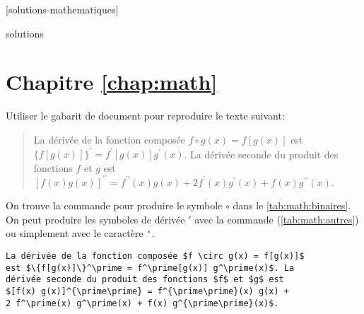 [solutions-mathematiques]

\begin{Filesave}{solutions}
\section*{Chapitre \ref*{chap:math}}

\end{Filesave}

\begin{exercice}
  Utiliser le gabarit de document  pour
  reproduire le texte suivant:
  \begin{quote}
    La dérivée de la fonction composée $f \circ g(x) = f[g(x)]$ est
    $\{f[g(x)]\}^\prime = f^\prime[g(x)] g^\prime(x)$. La dérivée
    seconde du produit des fonctions $f$ et $g$ est $[f(x)
    g(x)]^{\prime\prime} = f^{\prime\prime}(x) g(x) + 2 f^\prime(x)
    g^\prime(x) + f(x) g^{\prime\prime}(x)$.
  \end{quote}
  \begin{sol}
    On trouve la commande pour produire le symbole $\circ$ dans le
    \autoref{tab:math:binaires}. On peut produire les symboles de
    dérivée $\prime$ avec la commande \cmd{\prime}
    (\autoref{tab:math:autres}) ou simplement avec le caractère
    \verb='=.
\begin{lstlisting}
La dérivée de la fonction composée $f \circ g(x) = f[g(x)]$
est $\{f[g(x)]\}^\prime = f^\prime[g(x)] g^\prime(x)$. La
dérivée seconde du produit des fonctions $f$ et $g$ est
$[f(x) g(x)]^{\prime\prime} = f^{\prime\prime}(x) g(x) +
2 f^\prime(x) g^\prime(x) + f(x) g^{\prime\prime}(x)$.
\end{lstlisting}
  \end{sol}
\end{exercice}

